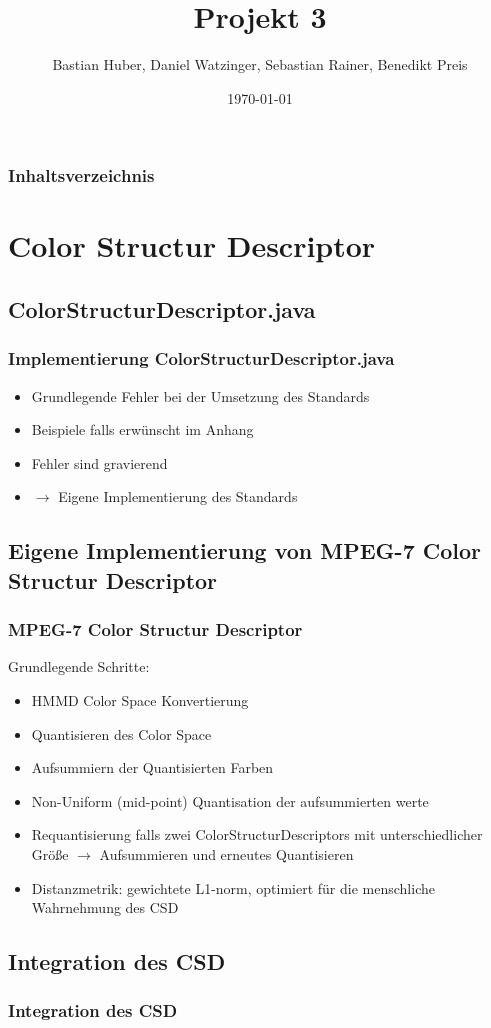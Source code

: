 \documentclass[11pt]{beamer}
\begin{document}
\graphicspath{{img/}}

\title[Multimedia Datenbanken]{Projekt 3}
\subtitle[Multimedia Datenbanken]{}
\author{Bastian Huber, Daniel Watzinger, Sebastian Rainer, Benedikt Preis}
\date{\today}

\frame{
	\titlepage
}

\begin{frame}
	\frametitle{Inhaltsverzeichnis}
	\tableofcontents
\end{frame}

\section{Color Structur Descriptor}
\subsection{ColorStructurDescriptor.java}
\begin{frame}
	\frametitle{Implementierung ColorStructurDescriptor.java}
	\begin{itemize}
		\item Grundlegende Fehler bei der Umsetzung des Standards
		\item Beispiele falls erwünscht im Anhang
		\item Fehler sind gravierend
		\item $\rightarrow$ Eigene Implementierung des Standards
	\end{itemize}
\end{frame}

\subsection{Eigene Implementierung von MPEG-7 Color Structur Descriptor}
\begin{frame}
	\frametitle{MPEG-7 Color Structur Descriptor}
	Grundlegende Schritte:
	\begin{itemize}
		\item HMMD Color Space Konvertierung
		\item Quantisieren des Color Space
		\item Aufsummiern der Quantisierten Farben
		\item Non-Uniform (mid-point) Quantisation der aufsummierten werte
		\item Requantisierung falls zwei ColorStructurDescriptors mit unterschiedlicher Größe $\rightarrow$ Aufsummieren und erneutes Quantisieren
		\item Distanzmetrik: gewichtete L1-norm, optimiert für die menschliche Wahrnehmung des CSD 

	\end{itemize}
\end{frame}

\subsection{Integration des CSD}
\begin{frame}
	\frametitle{Integration des CSD}
	
\end{frame}
\end{document}
